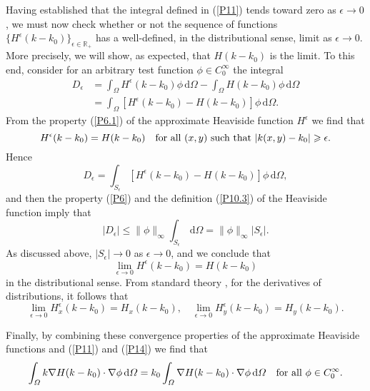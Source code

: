 \documentclass{imanum}
\begin{document}
Having established that the integral defined in (\ref{P11}) tends
toward zero as $\epsilon \rightarrow 0$, we must now check whether
or not the sequence of functions
$\{ H^{\epsilon}(k-k_0) \}_{\epsilon \in \mathbb{R}_+}$ has a well-defined,
in the distributional sense, limit as $\epsilon \rightarrow 0$. More
precisely, we will show, as expected, that $H(k-k_0)$ is the limit.
To this end, consider for an arbitrary test function
$\phi \in C^{\infty}_0$ the integral
\begin{align*}
D_\epsilon &= \int_\Omega H^\epsilon (k-k_0) \phi \, \mathrm{d} \Omega
- \int_\Omega H(k-k_0) \phi \, \mathrm{d} \Omega \\[3pt]
&= \int_\Omega [H^\epsilon (k-k_0)- H(k-k_0)] \phi \, \mathrm{d} \Omega.
\end{align*}
From the property (\ref{P6.1}) of the approximate Heaviside function
$H^\epsilon$ we find that
\begin{equation*}
H^\epsilon (k-k_0) = H(k-k_0)  \quad \hbox{for all}\ (x,y)
\hbox{ such that }|k(x,y)-k_0| \geq \epsilon.
\end{equation*}
Hence
\begin{equation*}
D_\epsilon = \int_{S_\epsilon}
[H^\epsilon (k-k_0)- H(k-k_0)] \phi \, \mathrm{d} \Omega,
\end{equation*}
and then the property (\ref{P6}) and the definition (\ref{P10.3}) of
the Heaviside function imply that
\begin{equation*}
|D_\epsilon| \leq
\parallel\! \phi \!\parallel_\infty
\int_{S_{\epsilon}} \, \mathrm{d} \Omega =
\parallel\! \phi \!\parallel_\infty |S_\epsilon| .
\end{equation*}
As discussed above, $|S_\epsilon| \rightarrow 0$ as
$\epsilon \rightarrow 0$, and we conclude that
\begin{equation*}
\lim_{\epsilon \rightarrow 0}H^\epsilon (k-k_0) = H(k-k_0)
\end{equation*}
in the distributional sense. From standard theory
\citep[see][]{BGri81},
for the derivatives of distributions, it follows that
\begin{equation*}
\lim_{\epsilon \rightarrow 0}H^\epsilon_x (k-k_0)
= H_x(k-k_0),
\quad  \lim_{\epsilon \rightarrow 0}H^\epsilon_y (k-k_0)
= H_y(k-k_0).
\end{equation*}

Finally, by combining these convergence properties of the approximate
Heaviside functions and (\ref{P11}) and (\ref{P14}) we find that
\begin{equation*}
\int_\Omega k \nabla H(k-k_0) \cdot \nabla \phi \, \mathrm{d} \Omega =
k_0 \int_\Omega \nabla H(k-k_0) \cdot \nabla \phi \, \mathrm{d} \Omega
\quad \hbox{for all}\ \phi \in C^\infty_0 .
\end{equation*}
\end{document}

